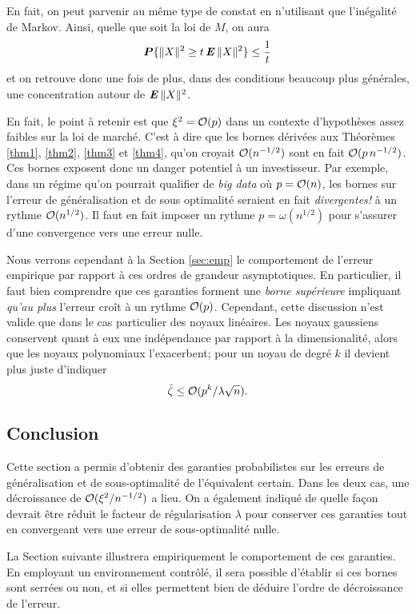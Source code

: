 En fait, on peut parvenir au même type de constat en n'utilisant que l'inégalité de
Markov. Ainsi, quelle que soit la loi de $M$, on aura
\begin{equation}
  \bm P\{\|X\|^2 \ge t\operatorname{\mbox{\textbf{\textit{E}}}}\|X\|^2\} \leq \frac{1}{t}
\end{equation}
et on retrouve donc une fois de plus, dans des conditions beaucoup plus générales, une
concentration autour de $\operatorname{\mbox{\textbf{\textit{E}}}}\|X\|^2$. 

En fait, le point à retenir est que $\xi^2 = \mathcal O(p)$ dans un contexte d'hypothèses assez
faibles sur la loi de marché. C'est à dire que les bornes dérivées aux Théorèmes
\ref{thm1}, \ref{thm2}, \ref{thm3} et \ref{thm4}, qu'on croyait
$\mathcal O(n^{-1/2})$ sont en fait $\mathcal O(p\,n^{-1/2})$. Ces bornes exposent donc un
danger potentiel à un investisseur. Par exemple, dans un régime qu'on pourrait qualifier
de \textit{big data} où $p=\mathcal O(n)$, les bornes sur l'erreur de généralisation et de sous
optimalité seraient en fait \textit{divergentes!} à un rythme $\mathcal O(n^{1/2})$. Il faut en
fait imposer un rythme $p = \omega(n^{1/2})$ pour s'assurer d'une convergence vers une erreur
nulle.

Nous verrons cependant à la Section \ref{sec:emp} le comportement de l'erreur empirique
par rapport à ces ordres de grandeur asymptotiques. En particulier, il faut bien
comprendre que ces garanties forment une \textit{borne supérieure} impliquant \textit{qu'au plus}
l'erreur croît à un rythme $\mathcal O(p)$. 
Cependant, cette discussion n'est valide que dans le cas particulier des noyaux
linéaires. Les noyaux gaussiens conservent quant à eux une indépendance par rapport à la
dimensionalité, alors que les noyaux polynomiaux l'exacerbent; pour un noyau de degré $k$
il devient plus juste d'indiquer
\begin{equation}
  \hat\zeta \leq \mathcal O(p^k/\lambda\sqrt{n}).
\end{equation}

\subsection{Conclusion}

Cette section a permis d'obtenir des garanties probabilistes sur les erreurs de
généralisation et de sous-optimalité de l'équivalent certain. Dans les deux cas, une
décroissance de $\mathcal O(\xi^2/n^{-1/2})$ a lieu. On a également indiqué de quelle façon
devrait être réduit le facteur de régularisation $\lambda$ pour conserver ces garanties tout en
convergeant vers une erreur de sous-optimalité nulle.

La Section suivante illustrera empiriquement le comportement de ces garanties. En
employant un environnement contrôlé, il sera possible d'établir si ces bornes sont serrées
ou non, et si elles permettent bien de déduire l'ordre de décroissance de l'erreur. 






